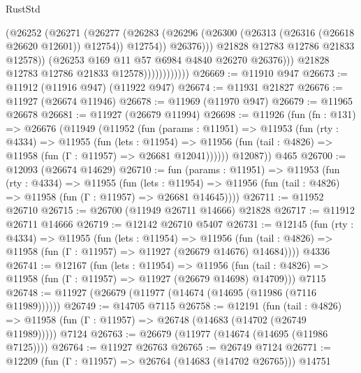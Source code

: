 \begin{lexlean}{RustStd}
\begin{coremodule}
                                    (@26252
                                      (@26271
                                        (@26277
                                          (@26283
                                            (@26296
                                              (@26300
                                                (@26313 (@26316 (@26618 @26620 @12601)) @12754))
                                              @12754))
                                          @26376)))
                                    @21828
                                    @12783
                                    @12786
                                    @21833
                                    @12578))
                                (@26253 @169 @11 @57 @6984 @4840 @26270 @26376)))
                            @21828
                            @12783
                            @12786
                            @21833
                            @12578))))))))))))
@26669 := @11910 @947
@26673 := @11912 (@11916 @947) (@11922 @947)
@26674 := @11931 @21827
@26676 := @11927 (@26674 @11946)
@26678 := @11969 (@11970 @947)
@26679 := @11965 @26678
@26681 := @11927 (@26679 @11994)
@26698 := @11926
    (fun (fn : @131) =>
    @26676
      (@11949
        (@11952
          (fun (params : @11951) =>
          @11953
            (fun (rty : @4334) =>
            @11955
              (fun (lets : @11954) =>
              @11956 (fun (tail : @4826) => @11958 (fun (Γ : @11957) => @26681 @12041))))))
        @12087))
    @465
@26700 := @12093 (@26674 @14629)
@26710 := fun (params : @11951) =>
  @11953
    (fun (rty : @4334) =>
    @11955
      (fun (lets : @11954) =>
      @11956 (fun (tail : @4826) => @11958 (fun (Γ : @11957) => @26681 @14645))))
@26711 := @11952 @26710
@26715 := @26700 (@11949 @26711 @14666) @21828
@26717 := @11912 @26711 @14666
@26719 := @12142 @26710 @5407
@26731 := @12145
    (fun (rty : @4334) =>
    @11955
      (fun (lets : @11954) =>
      @11956 (fun (tail : @4826) => @11958 (fun (Γ : @11957) => @11927 (@26679 @14676) @14684))))
    @4336
@26741 := @12167
    (fun (lets : @11954) =>
    @11956 (fun (tail : @4826) => @11958 (fun (Γ : @11957) => @11927 (@26679 @14698) @14709)))
    @7115
@26748 := @11927 (@26679 (@11977 (@14674 (@14695 (@11986 (@7116 @11989))))))
@26749 := @14705 @7115
@26758 := @12191
    (fun (tail : @4826) => @11958 (fun (Γ : @11957) => @26748 (@14683 (@14702 (@26749 @11989)))))
    @7124
@26763 := @26679 (@11977 (@14674 (@14695 (@11986 @7125))))
@26764 := @11927 @26763
@26765 := @26749 @7124
@26771 := @12209 (fun (Γ : @11957) => @26764 (@14683 (@14702 @26765))) @14751

\end{coremodule}
\end{lexlean}
